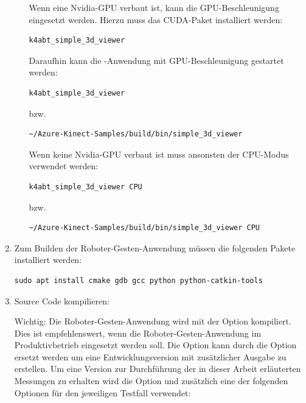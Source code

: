 \begin{enumerate}[label*=\arabic*.]
\begin{enumerate}[label*=\arabic*.]
                Wenn eine Nvidia-GPU verbaut ist, kann die GPU-Beschleunigung eingesetzt werden. Hierzu muss das CUDA-Paket installiert werden:
                \begin{lstlisting}[style=bash]
k4abt_simple_3d_viewer
                \end{lstlisting}

                Daraufhin kann die -Anwendung mit GPU-Beschleunigung gestartet werden:
                \begin{lstlisting}[style=bash]
k4abt_simple_3d_viewer
                \end{lstlisting}

                bzw.

                \begin{lstlisting}[style=bash]
~/Azure-Kinect-Samples/build/bin/simple_3d_viewer
                \end{lstlisting}

                Wenn keine Nvidia-GPU verbaut ist muss ansonsten der CPU-Modus verwendet werden:
                \begin{lstlisting}[style=bash]
k4abt_simple_3d_viewer CPU
                \end{lstlisting}

                bzw.

                \begin{lstlisting}[style=bash]
~/Azure-Kinect-Samples/build/bin/simple_3d_viewer CPU
                \end{lstlisting}
        \end{enumerate}

    \item Zum Builden der Roboter-Gesten-Anwendung müssen die folgenden Pakete installiert werden:
        \begin{lstlisting}[style=bash]
sudo apt install cmake gdb gcc python python-catkin-tools
        \end{lstlisting}

    \item Source Code kompilieren:\\
        \begin{redbox}{Wichtig:}
            Die Roboter-Gesten-Anwendung wird mit der Option  kompiliert. Dies ist empfehlenswert, wenn die Roboter-Gesten-Anwendung im Produktivbetrieb eingesetzt werden soll. Die Option  kann durch die Option  ersetzt werden um eine Entwicklungsversion mit zusätzlicher Ausgabe zu erstellen. Um eine Version zur Durchführung der in dieser Arbeit erläuterten Messungen zu erhalten wird die Option  und zusätzlich eine der folgenden Optionen für den jeweiligen Testfall verwendet:


\end{redbox}
\end{enumerate}
